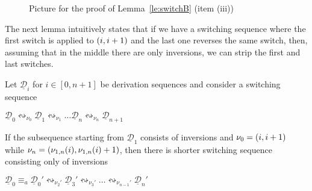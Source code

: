 \documentclass[a4paper,UKenglish,cleveref,pdftex,thm-restate,numberwithinsect]{lipics-v2021}
\newcommand{\interval}[2][1]{\ensuremath{[{#1},{#2}]}}
\newcommand{\dder}[1]{\mathscr{#1}}
\newcommand{\der}[1]{\underline{\dder{#1}}}
\newcommand{\shift}[1]{\ensuremath{\mathrel{{\leftrightsquigarrow}_{#1}}}}
\begin{document}
\begin{figure}
  \caption{Picture for the proof of Lemma~\ref{le:switchB} (item (iii))}
  \label{fi:switchB2}
\end{figure}

The next lemma intuitively states that if we have a switching sequence
where the first switch is applied to $\transp{i}$ and the last one
reverses the same switch, then, assuming that in the middle there are
only inversions, we can strip the first and last switches.

\begin{lemma}
  \label{le:switchC}
  Let $\der{D}_i$ for $i \in \interval[0]{n+1}$ be derivation sequences
  and consider a switching sequence
  \begin{center}
    $\der{D}_0 \shift{\nu_0} \der{D}_1 \shift{\nu_1} \ldots
     \der{D}_n \shift{\nu_n} \der{D}_{n+1}$
  \end{center}
  If the subsequence starting from $\der{D}_1$ consists of
  inversions and $\nu_0=\transp{i}$ while
  $\nu_n = \transp{\nu_{1,n}(i)}$, then there is shorter switching sequence
  consisting only of inversions
  \begin{center}
    $\der{D}_0 \equiv_a \der{D}_0' \shift{\nu_2'} \der{D}_3' \shift{\nu_3'} \ldots
    \shift{\nu_{n-1}'} \der{D}_n'$
  \end{center}
\end{lemma}
\end{document}
